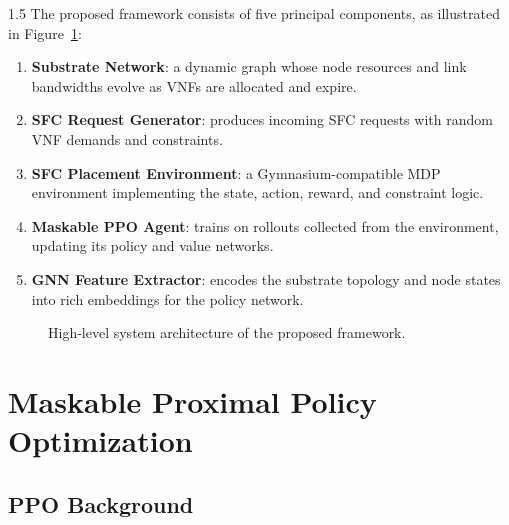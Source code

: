 \documentclass[A4paper,12pt]{report}
\theoremstyle{plain}
\theoremstyle{definition}
\theoremstyle{remark}
\numberwithin{equation}{section}
\begin{document}
\begin{spacing}{1.5}
The proposed framework consists of five principal components, as illustrated in Figure~\ref{fig:architecture}:

\begin{enumerate}
  \item \textbf{Substrate Network}: a dynamic graph whose node resources and link bandwidths evolve as VNFs are allocated and expire.
  \item \textbf{SFC Request Generator}: produces incoming SFC requests with random VNF demands and constraints.
  \item \textbf{SFC Placement Environment}: a Gymnasium-compatible MDP environment implementing the state, action, reward, and constraint logic.
  \item \textbf{Maskable PPO Agent}: trains on rollouts collected from the environment, updating its policy and value networks.
  \item \textbf{GNN Feature Extractor}: encodes the substrate topology and node states into rich embeddings for the policy network.
\end{enumerate}

\begin{figure}[!ht]
\centering
{}
\caption{High-level system architecture of the proposed framework.}
\label{fig:architecture}
\end{figure}

\section{Maskable Proximal Policy Optimization}

\subsection{PPO Background}


\end{spacing}
\end{document}
